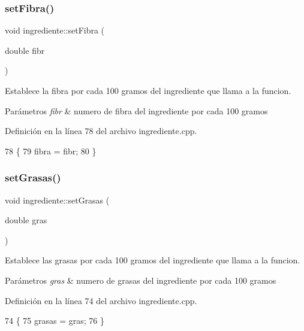 \subsubsection{\texorpdfstring{set\+Fibra()}{setFibra()}}
{\footnotesize\ttfamily void ingrediente\+::set\+Fibra (\begin{DoxyParamCaption}\item[{double}]{fibr }\end{DoxyParamCaption})}



Establece la fibra por cada 100 gramos del ingrediente que llama a la funcion. 


\begin{DoxyParams}{Parámetros}
{\em fibr} & numero de fibra del ingrediente por cada 100 gramos \\
\hline
\end{DoxyParams}


Definición en la línea 78 del archivo ingrediente.\+cpp.


\begin{DoxyCode}
78                                      \{
79     fibra = fibr;
80 \}
\end{DoxyCode}
\mbox{\label{classingrediente_a726805f6d65d583f7ca96102e13b9715}} 
\subsubsection{\texorpdfstring{set\+Grasas()}{setGrasas()}}
{\footnotesize\ttfamily void ingrediente\+::set\+Grasas (\begin{DoxyParamCaption}\item[{double}]{gras }\end{DoxyParamCaption})}



Establece las grasas por cada 100 gramos del ingrediente que llama a la funcion. 


\begin{DoxyParams}{Parámetros}
{\em gras} & numero de grasas del ingrediente por cada 100 gramos \\
\hline
\end{DoxyParams}


Definición en la línea 74 del archivo ingrediente.\+cpp.


\begin{DoxyCode}
74                                       \{
75     grasas = gras;
76 \}
\end{DoxyCode}
\mbox{\label{classingrediente_a832c6b1bd7b1a23299e685df560cc168}} 
